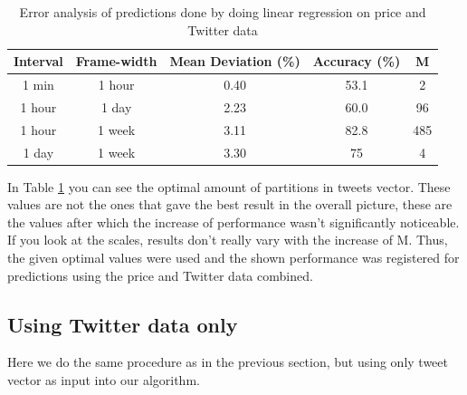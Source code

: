 \documentclass[a4paper,11pt,oneside]{article}
\begin{document}
  \begin{table}[h!]
  	\begin{center}
  		\begin{tabular}{|c c c c c|} 
  			\hline
  			Interval & Frame-width & Mean Deviation (\%) & Accuracy (\%) & M \\ [0.5ex] 
  			\hline\hline
  			1 min & 1 hour & 0.40 & 53.1 & 2\\ 
  			\hline
  			1 hour & 1 day & 2.23 & 60.0 & 96 \\
  			\hline
  			1 hour & 1 week & 3.11 & 82.8 & 485\\  			
  			\hline
  			1 day & 1 week & 3.30 & 75 & 4\\
  			\hline
  		\end{tabular}
  		\caption{Error analysis of predictions done by doing linear regression on price and Twitter data}
  		\label{tablePricesAndTweets}
  	\end{center}
  \end{table}
  
  In Table \ref{tablePricesAndTweets} you can see the optimal amount of partitions in tweets vector. These values are not the ones that gave the best result in the overall picture, these are the values after which the increase of performance wasn't significantly noticeable. If you look at the scales, results don't really vary with the increase of M. Thus, the given optimal values were used and the shown performance was registered for predictions using the price and Twitter data combined.
  
  \subsection{Using Twitter data only}
  
  Here we do the same procedure as in the previous section, but using only tweet vector as input into our algorithm.
  
\end{document}
